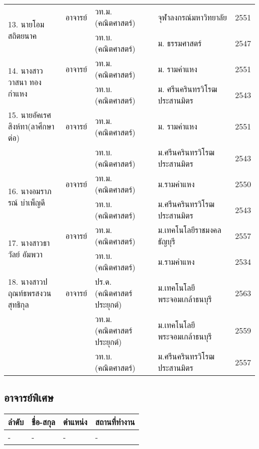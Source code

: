 \begin{center}
{\begin{longtable}{|p{}|p{}|p{}|p{}|p{}|}
		
		\multirow{2}{*}{13. นายโอม สถิตยนาค}&อาจารย์	& วท.ม.  (คณิตศาสตร์)& จุฬาลงกรณ์มหาวิทยาลัย& 2551\\\cline{3-5}
		&&วท.บ. (คณิตศาสตร์)&ม. ธรรมศาสตร์&2547\\\hline
		
		\multirow{2}{*}{14. นางสาววาสนา ทองกำแหง}&อาจารย์&วท.ม. (คณิตศาสตร์)& ม. รามคำแหง&2551\\\cline{3-5}
		&&วท.บ. (คณิตศาสตร์)&ม. ศรีนครินทรวิโรฒประสานมิตร&2543\\\hline
	
\newpage%
	
		15. นายอัคเรศ สิงห์ทา\newline (ลาศึกษาต่อ)&อาจารย์&
		วท.ม. (คณิตศาสตร์)& ม. รามคำแหง&2551\\\cline{3-5}
		&& วท.บ. (คณิตศาสตร์)& 	ม.ศรีนครินทรวิโรฒประสานมิตร&2543\\\hline
	

	\multirow{2}{*}{16. นางอมราภรณ์ บำเพ็ญดี}&	อาจารย์&วท.ม.(คณิตศาสตร์)&ม.รามคำแหง&2550\\\cline{3-5}
	&&วท.บ.(คณิตศาสตร์)&ม.ศรีนครินทรวิโรฒประสานมิตร&2543\\\hline
	

	\multirow{2}{*}{17. นางสาวธาวัลย์ อัมพวา}&	อาจารย์&วท.ม.(คณิตศาสตร์)&ม.เทคโนโลยีราชมงคลธัญบุรี&2557\\\cline{3-5}
	&&วท.บ.(คณิตศาสตร์)&ม.รามคำแหง&2534\\\hline

    18. นางสาวปฤณท์ธพร\newline สงวนสุทธิกุล &อาจารย์&ปร.ด. (คณิตศาสตร์ประยุกต์)&ม.เทคโนโลยีพระจอมเกล้าธนบุรี&2563\\
	\cline{3-5}
	&&วท.ม. (คณิตศาสตร์ประยุกต์)&ม.เทคโนโลยีพระจอมเกล้าธนบุรี&2559 \\
	\cline{3-5}
	&&วท.บ. (คณิตศาสตร์) &ม.ศรีนครินทรวิโรฒประสานมิตร&2557\\\hline
		\end{longtable}}
\end{center}

\subsection*{อาจารย์พิเศษ}

\begin{center}
\centering
\begin{tabular}{|p{}|p{}|p{}|p{}|}
\hline
\multicolumn{1}{|c|}{\bf ลำดับ} & \multicolumn{1}{c|}{\bf ชื่อ-สกุล} & \multicolumn{1}{c|}{\bf ตำแหน่ง} & \multicolumn{1}{c|}{\bf สถานที่ทำงาน} \\
\hline
-     & -         & -       & - \\
\hline          
\end{tabular}
\end{center}

